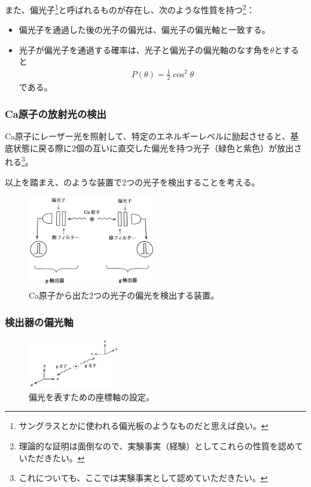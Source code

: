 \documentclass[10pt,b5paper,papersize,dvipdfmx]{jsbook}
\begin{document}
\par
また、偏光子\footnote{
  サングラスとかに使われる偏光板のようなものだと思えば良い。
}と呼ばれるものが存在し、次のような性質を持つ\footnote{
  理論的な証明は面倒なので、実験事実（経験）としてこれらの性質を認めていただきたい。
}：
\begin{itemize}
  \item 偏光子を通過した後の光子の偏光は、偏光子の偏光軸と一致する。
  \item 光子が偏光子を通過する確率は、光子と偏光子の偏光軸のなす角を$\theta$とすると
    \begin{align}
      P(\theta) = \frac12 \cos^2\theta
      \label{eq:P(theta)}
    \end{align}
    である。
\end{itemize}

%
\subsubsection{Ca原子の放射光の検出} %

Ca原子にレーザー光を照射して、特定のエネルギーレベルに励起させると、基底状態に戻る際に2個の互いに直交した偏光を持つ光子（緑色と紫色）が放出される\footnote{
  これについても、ここでは実験事実として認めていただきたい。
}。\par
以上を踏まえ、のような装置で2つの光子を検出することを考える。

\begin{figure}[htb]
  \centering
  \includegraphics[height=40mm]{nkym/fig/souchi.jpeg}
  \caption{Ca原子から出た2つの光子の偏光を検出する装置。} %
  \label{fig:Ca-machine}
\end{figure}

%
\subsubsection{検出器の偏光軸} %

\begin{figure}[ht]
  \centering
  \includegraphics[width=40mm]{nkym/fig/zahyou-kei.jpeg}
  \caption{偏光を表すための座標軸の設定。} %
  \label{fig:zahyou-jiku}
\end{figure}
\end{document}

